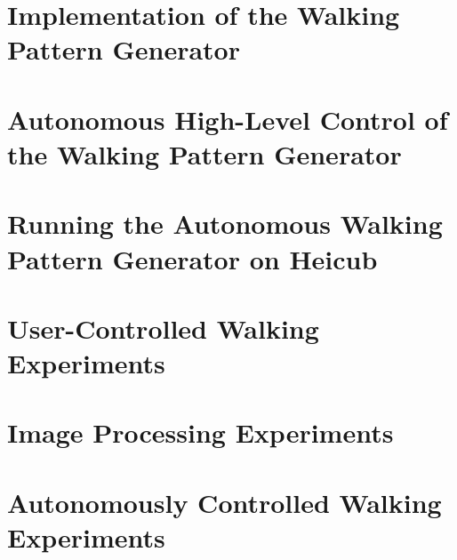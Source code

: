 \documentclass  [
paper    = a4,
BCOR     = 10mm,
twoside,
fontsize = 12pt,
toc      = bibnumbered,
toc      = listofnumbered,
numbers  = noendperiod,
headings = normal,
listof   = leveldown,
version  = 3.03
]                                       {scrreprt}
\newcommand\blankpage{
	\null
	\thispagestyle{empty}
	\addtocounter{page}{-1}
	\newpage
}
\begin{document}
	\FloatBarrier
	\chapter{Implementation of the Walking Pattern Generator}
	
	
	

	\afterpage{\blankpage}
	\FloatBarrier
	\chapter{Autonomous High-Level Control of the Walking Pattern Generator}
	
	\afterpage{\blankpage}
	\FloatBarrier
	\chapter{Running the Autonomous Walking Pattern Generator on Heicub}
	
	
	\FloatBarrier
	\chapter{User-Controlled Walking Experiments}
	

	\FloatBarrier
	\chapter{Image Processing Experiments}
	

	\afterpage{\blankpage}
	\afterpage{\blankpage}
	\FloatBarrier
	\chapter{Autonomously Controlled Walking Experiments}
	
	
\end{document}
